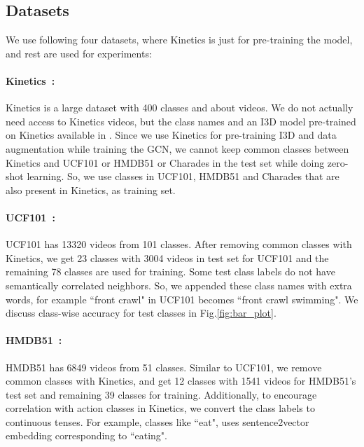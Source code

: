 \subsection{Datasets}

We use following four datasets, where Kinetics is just for pre-training the model, and rest are used for experiments:

\paragraph{\bf{Kinetics}~\cite{kay2017kinetics}:} Kinetics is a large dataset with 400 classes and about  videos. We do not actually need access to Kinetics videos, but the class names and an I3D model pre-trained on Kinetics available in \cite{carreira2017quo}. Since we use Kinetics for pre-training I3D and data augmentation while training the GCN, we cannot keep common classes between Kinetics and UCF101 or HMDB51 or Charades in the test set while doing zero-shot learning. So, we use classes in UCF101, HMDB51 and Charades that are also present in Kinetics, as training set.

\paragraph{\bf{UCF101}~\cite{soomro2012ucf101}:} UCF101 has 13320 videos from 101 classes. After removing common classes with Kinetics, we get 23 classes with 3004 videos in test set for UCF101 and the remaining 78 classes are used for training. Some test class labels do not have semantically correlated neighbors. So, we appended these class names with extra words, for example ``front crawl" in UCF101 becomes ``front crawl swimming". We discuss class-wise accuracy for test classes in Fig.\ref{fig:bar_plot}.


\paragraph{\bf{HMDB51}~\cite{kuehne2013hmdb51}:} HMDB51 has 6849 videos from 51 classes. Similar to UCF101, we remove common classes with Kinetics, and get 12 classes with 1541 videos for HMDB51's test set and remaining 39 classes for training. Additionally, to encourage correlation with action classes in Kinetics, we convert the class labels to continuous tenses. For example, classes like ``eat", uses sentence2vector embedding corresponding to ``eating".

